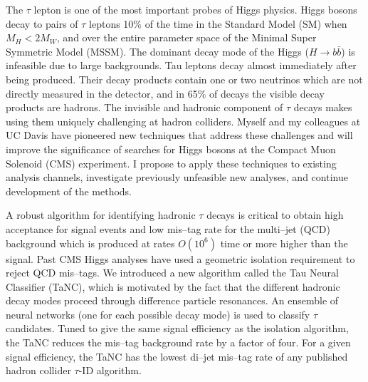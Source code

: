 \documentclass[a4paper,10pt,oneside]{article}
\begin{document}
\maketitle 

The $\tau$ lepton is one of the most important probes of Higgs physics.  Higgs
bosons decay to pairs of $\tau$ leptons 10\% of the time in the Standard Model
(SM) when $M_H < 2M_W$, and over the entire parameter space of the Minimal Super
Symmetric Model (MSSM).  The dominant decay mode of the Higgs ($H\rightarrow b
\bar b$) is infeasible due to large backgrounds.  Tau leptons decay almost
immediately after being produced.  Their decay products contain one or two
neutrinos which are not directly measured in the detector, and in 65\% of decays
the visible decay products are hadrons.  The invisible and hadronic component of
$\tau$ decays makes using them uniquely challenging at hadron colliders.  Myself
and my colleagues at UC Davis have pioneered new techniques that address these
challenges and will improve the significance of searches for Higgs bosons at the
Compact Muon Solenoid (CMS) experiment.  I propose to apply these techniques to
existing analysis channels, investigate previously unfeasible new analyses, and
continue development of the methods.

A robust algorithm for identifying hadronic $\tau$ decays is critical to obtain
high acceptance for signal events and low mis--tag rate for the multi--jet (QCD)
background which is produced at rates $O(10^6)$ time or more higher than the
signal.  Past CMS Higgs analyses have used a geometric isolation requirement to
reject QCD mis--tags.  We introduced a new algorithm called the Tau Neural
Classifier (TaNC), which is motivated by the fact that the different hadronic
decay modes proceed through difference particle resonances.  An ensemble of
neural networks (one for each possible decay mode) is used to classify $\tau$
candidates.  Tuned to give the same signal efficiency as the isolation
algorithm, the TaNC reduces the mis--tag background rate by a factor of four.
For a given signal efficiency, the TaNC has the lowest di--jet mis--tag rate of
any published hadron collider $\tau$-ID algorithm.
\end{document}
